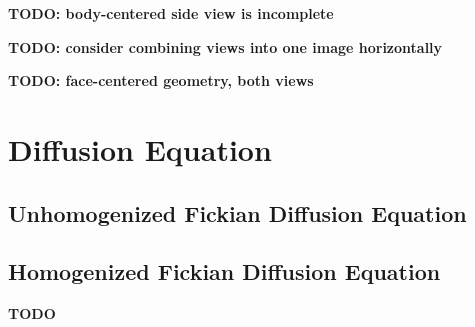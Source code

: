 \documentclass{article}
\begin{document}
\textbf{TODO: body-centered side view is incomplete}

\textbf{TODO: consider combining views into one image horizontally}

\textbf{TODO: face-centered geometry, both views}

\section{Diffusion Equation}\label{sec:equation}

\subsection{Unhomogenized Fickian Diffusion Equation}\label{subsec:unhom_fick}

\subsection{Homogenized Fickian Diffusion Equation}\label{subsec:hom_fick}



\textbf{TODO}
\end{document}
